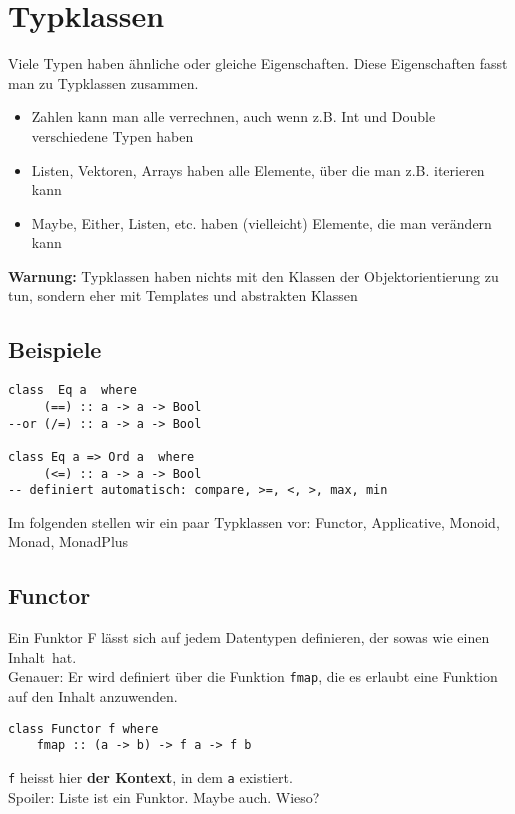 \documentclass{beamer}
\begin{document}

\section{Typklassen}
\begin{frame}
Viele Typen haben ähnliche oder gleiche Eigenschaften. Diese Eigenschaften fasst man zu Typklassen zusammen.\\
\pause
\begin{itemize}
 \item Zahlen kann man alle verrechnen, auch wenn z.B. Int und Double verschiedene Typen haben
 \item Listen, Vektoren, Arrays haben alle Elemente, über die man z.B. iterieren kann
 \item Maybe, Either, Listen, etc. haben (vielleicht) Elemente, die man verändern kann
\end{itemize}
\pause
\begin{important}
\textbf{Warnung:} Typklassen haben nichts mit den Klassen der Objektorientierung zu tun, sondern eher mit Templates und abstrakten Klassen
\end{important}
\end{frame}

\subsection{Beispiele}
\begin{frame}[fragile]
\begin{verbatim}
class  Eq a  where
     (==) :: a -> a -> Bool
--or (/=) :: a -> a -> Bool

class Eq a => Ord a  where
     (<=) :: a -> a -> Bool
-- definiert automatisch: compare, >=, <, >, max, min
\end{verbatim}
\pause
Im folgenden stellen wir ein paar Typklassen vor: Functor, Applicative, Monoid, Monad, MonadPlus
\end{frame}


\subsection{Functor}
\begin{frame}[fragile]
 Ein Funktor F lässt sich auf jedem Datentypen definieren, der sowas wie einen \glqq Inhalt\grqq \ hat.\\
 \pause
 Genauer: Er wird definiert über die Funktion \texttt{fmap}, die es erlaubt eine Funktion auf den Inhalt anzuwenden.
 \begin{verbatim}
class Functor f where
    fmap :: (a -> b) -> f a -> f b
 \end{verbatim}
 \texttt{f} heisst hier \textbf{der Kontext}, in dem \texttt{a} existiert.\\
\pause
\bigskip
Spoiler: Liste ist ein Funktor. Maybe auch. Wieso?
\end{frame}
\end{document}
